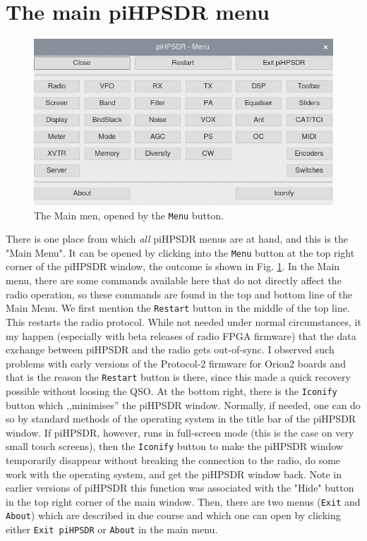 \documentclass[12pt]{book}
\def\rett#1{\texttt{\color{red}#1}}
\def\bltt#1{\texttt{\color{blue}#1}}
\def\pH{pi\-HPSDR\xspace}
\begin{document}
\section{The main \pH menu}
\begin{figure}[ht]
\center
\includegraphics[scale=0.45]{MainMenu.png}
\caption{The Main men, opened by the \rett{Menu} button.}
\label{fig:MainMenu}
\end{figure}

There is one place from which \textit{all} \pH menus are at hand,
and this is the "Main Menu". It can be opened by clicking into the \rett{Menu} button at the
top right corner of the \pH window, the outcome is shown in Fig. \ref{fig:MainMenu}.
In the Main menu, there are some commands available here that do not directly affect the radio operation,
so these commands are found in the top and bottom line of the Main Menu. We first
mention the \rett{Restart} button in the middle of the top line. This restarts the
radio protocol. While not needed under normal circumstances, it my happen (especially
with beta releases of radio FPGA firmware) that the data exchange between \pH and
the radio gets out-of-sync. I observed such problems with early versions of the Protocol-2
firmware for Orion2 boards and that is the reason the \rett{Restart} button is
there, since this made a quick recovery possible without loosing the QSO.
At the bottom right, there is the \rett{Iconify} button which ,,minimises'' the
\pH window. Normally, if needed, one can do so by standard methods of the
operating system in the title bar of the \pH window. If \pH, however,
runs in full-screen mode (this is the case on very small touch screens), then the
\rett{Iconify} button to make the \pH window temporarily disappear without
breaking the connection to the radio, do some work with the operating system, and
get the \pH window back. Note in earlier versions of \pH this function was
associated with the "Hide" button in the top right corner of the main window.
Then, there are two menus (\bltt{Exit} and \bltt{About}) which are described in due course and which
one can open by clicking either \rett{Exit \pH} or \rett{About} in the main menu.
\end{document}
